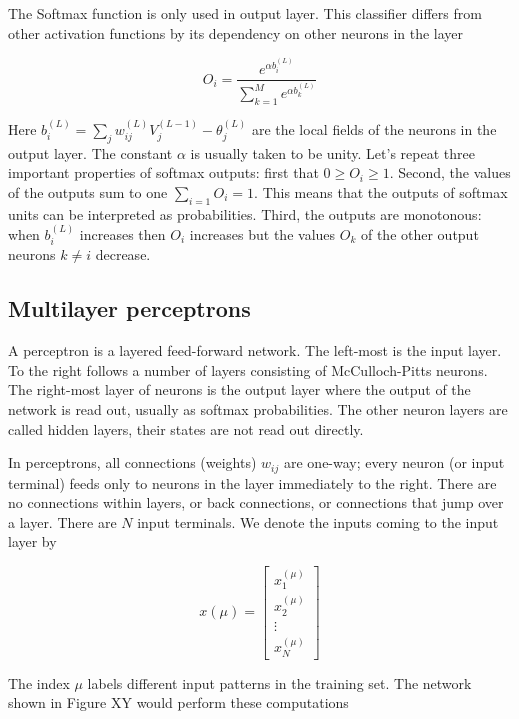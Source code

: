 \begin{itemize}
The Softmax function is only used in output layer. This classifier differs from other activation functions by its dependency on other neurons in the layer

$$  
O_{i} = \frac{e^{\alpha b_i^{(L)}}}{\sum_{k=1}^{M} e^{\alpha b_k^{(L)}}}
$$

Here $ b_{i}^{(L)} = \sum_{j}w_{ij}^{(L)} V_{j}^{(L-1)} - \theta _{j}^{(L)} $  are the local fields of the neurons in the output layer. The constant $\alpha$ is usually taken to be unity. Let's repeat three important properties of softmax outputs: first that 
$ 0 \geq O_i \geq 1 $. Second, the values of the outputs sum to one $ \sum_{i=1} O_i = 1 $. This means that the outputs of softmax units can be interpreted as probabilities. Third, the outputs are monotonous: when $ b_i^{(L)} $ increases then $ O_i $ increases but the values $ O_k $ of the other output neurons $ k \neq i $ decrease.

\end{itemize}

\subsection{Multilayer perceptrons}

A perceptron is a layered feed-forward network. The left-most is the input layer. To the right follows a number of layers consisting of McCulloch-Pitts neurons. The right-most layer of neurons is the output layer where the output of the network is read out, usually as softmax probabilities. The other neuron layers are called hidden layers, their states are not read out directly. 

In perceptrons, all connections (weights) $ w_{ij} $ are one-way; every neuron (or input terminal) feeds only to neurons in the layer immediately to the right. There are no connections within layers, or back connections, or connections that jump over a layer. There are $ N $ input terminals. We denote the inputs coming to the input layer by

$$ x(\mu)= 
\begin{bmatrix}
x_{1}^{(\mu)} \\
x_{2}^{(\mu)} \\
\vdots \\
x_{N}^{(\mu)} 
\end{bmatrix}
$$

The index $ \mu $ labels different input patterns in the training set. The network shown in Figure XY would perform these computations

